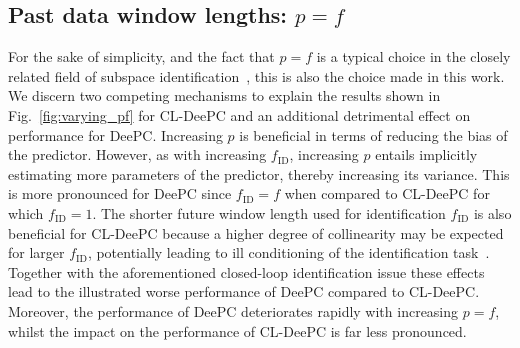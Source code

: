 \subsection{Past data window lengths: $p=f$}
\noindent For the sake of simplicity, and the fact that $p=f$ is a typical choice in the closely related field of subspace identification~\citep{vanderVeen2013}, this is also the choice made in this work. We discern two competing mechanisms to explain the results shown in Fig.~\ref{fig:varying_pf} for \ac{CL-DeePC} and an additional detrimental effect on performance for \ac{DeePC}. Increasing $p$ is beneficial in terms of reducing the bias of the predictor. However, as with increasing $f_\mathrm{ID}$, increasing $p$ entails implicitly estimating more parameters of the predictor, thereby increasing its variance. This is more pronounced for \ac{DeePC} since $f_\mathrm{ID}=f$ when compared to \ac{CL-DeePC} for which $f_\mathrm{ID}=1$. The shorter future window length used for identification $f_\mathrm{ID}$ is also beneficial for \ac{CL-DeePC} because a higher degree of collinearity may be expected for larger $f_\mathrm{ID}$, potentially leading to ill conditioning of the identification task~\citep{Chiuso2004}. Together with the aforementioned closed-loop identification issue these effects lead to the illustrated worse performance of \ac{DeePC} compared to \ac{CL-DeePC}. Moreover, the performance of \ac{DeePC} deteriorates rapidly with increasing $p=f$, whilst the impact on the performance of \ac{CL-DeePC} is far less pronounced.
